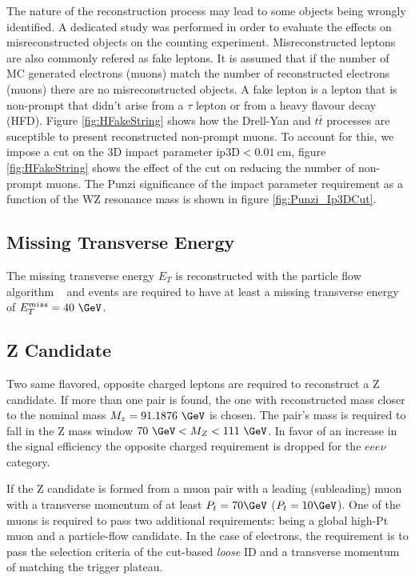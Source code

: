 The nature of the reconstruction process may lead to some objects being
wrongly identified. A dedicated study was performed in order to evaluate
the effects on misreconstructed objects on the counting experiment.
Misreconstructed leptons are also commonly refered as fake leptons. It
is assumed that if the number of MC generated electrons (muons) match
the number of reconstructed electrons (muons) there are no misreconstructed
objects. A fake lepton is a lepton that is non-prompt that didn't arise from
a $\tau$ lepton or from a heavy flavour decay (HFD). Figure \ref{fig:HFakeString}
shows how the Drell-Yan and $t\bar{t}$ processes are suceptible to present
reconstructed non-prompt muons. To account for this, we impose a cut on the
3D impact parameter $\mathrm{ip3D}<0.01~\mathrm{cm}$, figure \ref{fig:HFakeString}
shows the effect of the cut on reducing the number of non-prompt muons.
The Punzi significance of the impact parameter requirement as a function
of the WZ resonance mass is shown in figure \ref{fig:Punzi_Ip3DCut}. %



\subsection{Missing Transverse Energy}

The missing transverse energy $E_T$ is reconstructed with the particle flow
algorithm ~\cite{particleflow} and events are required to have at least a
missing transverse energy of $E_T^{miss}=40~\GeV$.

\subsection{Z Candidate}

Two same flavored, opposite charged leptons are required to reconstruct a Z
candidate. If more than one pair is found, the one with reconstructed mass
closer to the nominal mass $M_z=91.1876~\GeV$ is chosen. The pair's mass
is required to fall in the Z mass window $70~\GeV < M_Z < 111~\GeV$. In favor of an
increase in the signal efficiency the opposite charged requirement is dropped
for the $eee\nu$ category.

If the Z candidate is formed from a muon pair with a leading (subleading) muon with
a transverse momentum of at least $P_t=70 \GeV$ ($P_t=10\GeV$). One of the
muons is required to pass two additional requirements: being a global high-Pt muon and a
particle-flow candidate. In the case of electrons, the requirement is to pass the
selection criteria of the cut-based \emph{loose} ID and a transverse momentum of
matching the trigger plateau.

